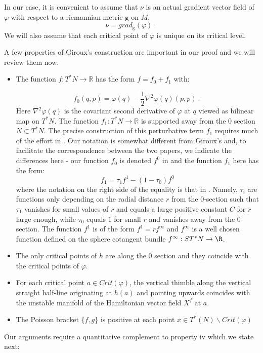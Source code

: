 In our case, it is convenient to assume that $\nu$ is an actual gradient 
vector field of $\varphi$ with respect to a riemannian metric $\texttt{g}$ on 
$M$, \begin{equation}\label{eq:nu-grad}
\nu= grad _{\texttt{g}}(\varphi)~.~
\end{equation}
We will also assume that each critical point of $\varphi$ is unique on its critical level.

A few properties of Giroux's construction are important in our proof and we will review them now.

\begin{itemize}
\item[i.] The function $f:T^{\ast}N\to \mathbb{R}$ has the form $f=f_{0}+f_{1}$ with: 

\begin{equation}\label{eq:expression_re}
f_{0}(q,p)=\varphi(q)-\frac{1}{2}\nabla^{2}\varphi (q)(p,p)~.~
\end{equation}
Here $\nabla^{2}\varphi (q)$ is the  covariant second derivative of $\varphi$ at $q$ viewed as bilinear map on $T^{\ast}N$. The function $f_{1}:T^{\ast}N\to \mathbb{R}$ is supported away from the $0$ section $N\subset T^{\ast}N$. The precise construction of this perturbative term  $f_{1}$ requires much of the effort in \cite{Gir:Lef-cot}. Our notation is somewhat different from Giroux's and, to facilitate the correspondence
between the two papers, we indicate the differences here - our function $f_{0}$ is denoted $f^{0}$ in \cite{Gir:Lef-cot} and the function $f_{1}$ here has the form:
$$ f_{1}= \tau_{1} f^{1} - (1-\tau_{0}) f^{0}$$
where the notation on the right side of the equality is that in \cite{Gir:Lef-cot}. Namely, $\tau_{i}$ are functions only depending on the radial distance $r$ from the $0$-section such that $\tau_{1}$ vanishes for small values of $r$ and equals a large positive constant $C$ for $r$ large enough, while $\tau_{0}$ equals $1$ for small $r$  and vanishes away from the $0$-section. The function $f^{1}$ is of the form $f^{1}=r f^{\infty}$ and $f^{\infty}$ is a well chosen function defined on the sphere cotangent bundle $f^{\infty}:ST^{\ast}N\to \R$.

\item[ii.] The only critical points of $h$ are along the $0$ section and they
coincide with the critical points of $\varphi$.

\item[iii.] For each critical point $a\in Crit(\varphi)$, the vertical thimble  along the vertical straight half-line originating at $h(a)$ and pointing upwards coincides with the  unstable manifold of the Hamiltonian vector field  $X^{f}$  at $a$.

\item[iv.] The Poisson bracket $\{f, g\}$ is positive at each point $x\in T^{\ast}(N)\backslash Crit(\varphi)$ 
\end{itemize}
Our arguments require a quantitative complement to property iv which we state next:

